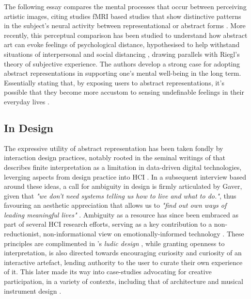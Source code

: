 The following essay compares the mental processes that occur between perceiving artistic images, citing studies fMRI based studies that show distinctive patterns in the subject's neural activity between representational or abstract forms \cite{aviv_what_2014}. More recently, this perceptual comparison has been studied to understand how abstract art can evoke feelings of psychological distance, hypothesised to help withstand situations of interpersonal and social distancing \cite{durkin_objective_2020}, drawing parallels with Riegl's theory of subjective experience. The authors develop a strong case for adopting abstract representations in supporting one's mental well-being in the long term. Essentially stating that, by exposing users to abstract representations, it's possible that they become more accustom to sensing undefinable feelings in their everyday lives \cite{durkin_objective_2020}.


\subsection{In Design}

The expressive utility of abstract representation has been taken fondly by interaction design practices, notably rooted in the seminal writings of \citeauthor{gaver_ambiguity_2003} that describes finite interpretation as a limitation in data-driven digital technologies, leverging aspects from design practice into HCI \cite{gaver_ambiguity_2003}. In a subsequent interview based around these ideas, a call for ambiguity in design is firmly articulated by Gaver, given that \textit{"we don’t need systems telling us how to live and what to do."}, thus favouring an aesthetic appreciation that allows us to \textit{"find out own ways of leading meaningful lives"} \cite{gaver_gaffney_2007}. Ambiguity as a resource has since been embraced as part of several HCI research efforts, serving as a key contribution to a non-reductionist, non-informational view on emotionally-informed technology \cite{sanches_ambiguity_2019,howell_biosignals_2016,stahl_evocative_2014}. These principles are complimented in \citeauthor{gaver_drift_2004}'s \textit{ludic design} \cite{gaver_drift_2004}, while granting openness to interpretation, is also directed towards encouraging curiosity and curiosity of an interactive artefact, lending authority to the user to curate their own experience of it. This later made its way into case-studies advocating for creative participation, in a variety of contexts, including that of architecture and musical instrument design \cite{harriss_ludic_2010,mcpherson_designing_2016}.

